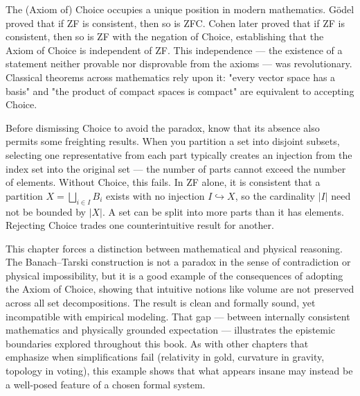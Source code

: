 The (Axiom of) Choice occupies a unique position in modern mathematics. Gödel proved that if ZF is consistent, then so is ZFC. Cohen later proved that if ZF is consistent, then so is ZF with the negation of Choice, establishing that the Axiom of Choice is independent of ZF. This independence — the existence of a statement neither provable nor disprovable from the axioms — was revolutionary. Classical theorems across mathematics rely upon it: "every vector space has a basis" and "the product of compact spaces is compact" are equivalent to accepting Choice. 

Before dismissing Choice to avoid the paradox, know that its absence also permits some freighting results. When you partition a set into disjoint subsets, selecting one representative from each part typically creates an injection from the index set into the original set — the number of parts cannot exceed the number of elements. Without Choice, this fails. In ZF alone, it is consistent that a partition $X = \bigsqcup_{i \in I} B_i$ exists with no injection $I \hookrightarrow X$, so the cardinality $|I|$ need not be bounded by $|X|$. A set can be split into more parts than it has elements. Rejecting Choice trades one counterintuitive result for another. 

\begin{commentary}[Commentary]
This chapter forces a distinction between mathematical and physical reasoning. The Banach–Tarski construction is not a paradox in the sense of contradiction or physical impossibility, but it is a good example of the consequences of adopting the Axiom of Choice, showing that intuitive notions like volume are not preserved across all set decompositions. The result is clean and formally sound, yet incompatible with empirical modeling. That gap — between internally consistent mathematics and physically grounded expectation — illustrates the epistemic boundaries explored throughout this book. As with other chapters that emphasize when simplifications fail (relativity in gold, curvature in gravity, topology in voting), this example shows that what appears insane may instead be a well-posed feature of a chosen formal system.

\end{commentary}

